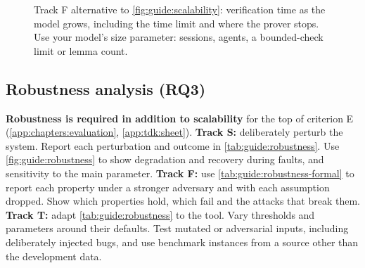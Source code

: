 \begin{figure}[!ht]
  \centering
  \caption{Track F alternative to \cref{fig:guide:scalability}: verification time as the model grows, including the time limit and where the prover stops. Use your model's size parameter: sessions, agents, a bounded-check limit or lemma count.}
  \label{fig:guide:scalability-formal}
\end{figure}

\subsection[Robustness analysis (RQ3)]{Robustness analysis (RQ3)\skimmark}\label{app:chapters:robustness}
\textbf{Robustness is required in addition to scalability} for the top of criterion E (\cref{app:chapters:evaluation}, \cref{app:tdk:sheet}).
\textbf{Track S:} deliberately perturb the system. Report each perturbation and outcome in \cref{tab:guide:robustness}. Use \cref{fig:guide:robustness} to show degradation and recovery during faults, and sensitivity to the main parameter.
\textbf{Track F:} use \cref{tab:guide:robustness-formal} to report each property under a stronger adversary and with each assumption dropped. Show which properties hold, which fail and the attacks that break them.
\textbf{Track T:} adapt \cref{tab:guide:robustness} to the tool. Vary thresholds and parameters around their defaults. Test mutated or adversarial inputs, including deliberately injected bugs, and use benchmark instances from a source other than the development data.

